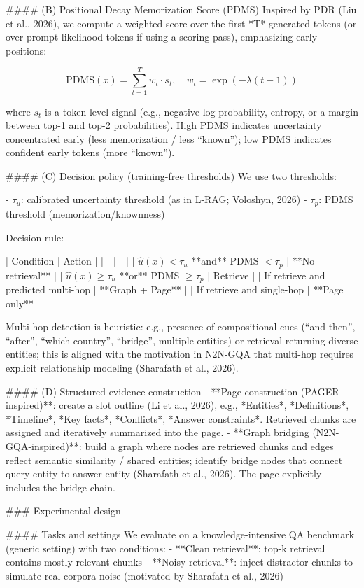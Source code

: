 #### (B) Positional Decay Memorization Score (PDMS)  
Inspired by PDR (Liu et al., 2026), we compute a weighted score over the first *T* generated tokens (or over prompt-likelihood tokens if using a scoring pass), emphasizing early positions:

\[
\text{PDMS}(x) = \sum_{t=1}^{T} w_t \cdot s_t,\quad w_t = \exp(-\lambda (t-1))
\]

where \(s_t\) is a token-level signal (e.g., negative log-probability, entropy, or a margin between top-1 and top-2 probabilities). High PDMS indicates uncertainty concentrated early (less memorization / less “known”); low PDMS indicates confident early tokens (more “known”).

#### (C) Decision policy (training-free thresholds)  
We use two thresholds:

- \( \tau_u \): calibrated uncertainty threshold (as in L-RAG; Voloshyn, 2026)  
- \( \tau_p \): PDMS threshold (memorization/knownness)

Decision rule:

| Condition | Action |
|---|---|
| \( \hat{u}(x) < \tau_u \) **and** PDMS \(< \tau_p\) | **No retrieval** |
| \( \hat{u}(x) \ge \tau_u \) **or** PDMS \( \ge \tau_p\) | Retrieve |
| If retrieve and predicted multi-hop | **Graph + Page** |
| If retrieve and single-hop | **Page only** |

Multi-hop detection is heuristic: e.g., presence of compositional cues (“and then”, “after”, “which country”, “bridge”, multiple entities) or retrieval returning diverse entities; this is aligned with the motivation in N2N-GQA that multi-hop requires explicit relationship modeling (Sharafath et al., 2026).

#### (D) Structured evidence construction  
- **Page construction (PAGER-inspired)**: create a slot outline (Li et al., 2026), e.g., *Entities*, *Definitions*, *Timeline*, *Key facts*, *Conflicts*, *Answer constraints*. Retrieved chunks are assigned and iteratively summarized into the page.  
- **Graph bridging (N2N-GQA-inspired)**: build a graph where nodes are retrieved chunks and edges reflect semantic similarity / shared entities; identify bridge nodes that connect query entity to answer entity (Sharafath et al., 2026). The page explicitly includes the bridge chain.

### Experimental design  

#### Tasks and settings  
We evaluate on a knowledge-intensive QA benchmark (generic setting) with two conditions:
- **Clean retrieval**: top-k retrieval contains mostly relevant chunks  
- **Noisy retrieval**: inject distractor chunks to simulate real corpora noise (motivated by Sharafath et al., 2026)

